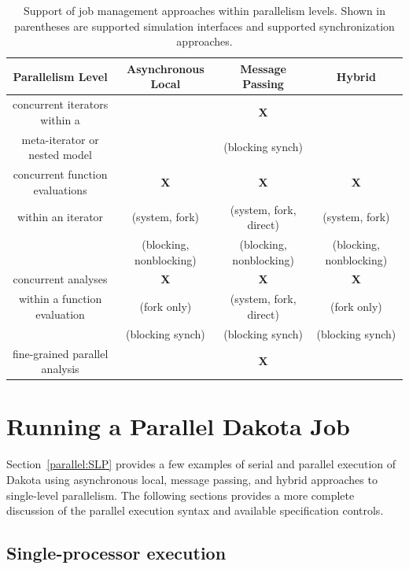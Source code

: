 \begin{table}
  \centering
  \caption{Support of job management approaches within parallelism levels.
  Shown in parentheses are supported simulation interfaces and supported
  synchronization approaches.}
  \label{parallel:table01}\vspace{2mm}
  \begin{tabular}{c||c|c|c|}
    \textbf{Parallelism Level} & \textbf{Asynchronous Local} &
    \textbf{Message Passing} & \textbf{Hybrid} \\
    \hline \hline
    concurrent iterators within a & & \textbf{X}      & \\
    meta-iterator or nested model & & (blocking synch) & \\
    \hline
    concurrent function evaluations & \textbf{X} & \textbf{X} & \textbf{X} \\
    within an iterator          & (system, fork) & (system, fork, direct) &
    (system, fork) \\
    & (blocking, nonblocking) & (blocking, nonblocking) &
      (blocking, nonblocking) \\
    \hline
    concurrent analyses & \textbf{X} & \textbf{X} & \textbf{X} \\
    within a function evaluation & (fork only) & (system, fork, direct) &
    (fork only) \\
    & (blocking synch) & (blocking synch) & (blocking synch) \\
    \hline
    fine-grained parallel analysis & & \textbf{X} & \\
    \hline
  \end{tabular}
\end{table}


\section{Running a Parallel Dakota Job}\label{parallel:running}


Section~\ref{parallel:SLP} provides a few examples of serial and
parallel execution of Dakota using asynchronous local, message
passing, and hybrid approaches to single-level parallelism.  The
following sections provides a more complete discussion of the parallel
execution syntax and available specification controls.


\subsection{Single-processor execution}\label{parallel:running:single}

